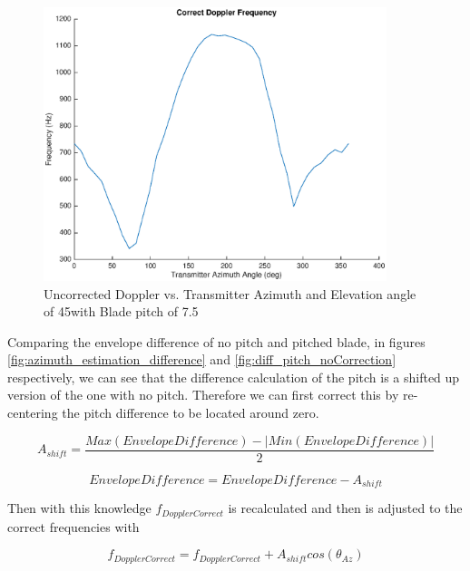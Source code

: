 \begin{figure}
	\begin{center}
		\includegraphics[width=10cm]{images/results/correct_dop_pitch_noCorrection.eps}
		\caption{Uncorrected Doppler vs. Transmitter Azimuth and Elevation angle of 45\textdegree with Blade pitch of 7.5\textdegree}
		\label{fig:dop_pitch_noCorrection}
	\end{center}
\end{figure}

Comparing the envelope difference of no pitch and pitched blade, in figures \ref{fig:azimuth_estimation_difference} and \ref{fig:diff_pitch_noCorrection} respectively, we can see that the difference calculation of the pitch is a shifted up version of the one with no pitch. Therefore we can first correct this by re-centering the pitch difference to be located around zero. 

\begin{equation}
	A_{shift} = \frac{Max(EnvelopeDifference) - |Min(EnvelopeDifference)|}{2}
	\label{eqn:pitch_shift}
\end{equation}

\begin{equation}
	EnvelopeDifference = EnvelopeDifference - A_{shift}
	\label{eqn:diff_shift}
\end{equation}

Then with this knowledge $f_{DopplerCorrect}$ is recalculated and then is adjusted to the correct frequencies with

\begin{equation}
	f_{DopplerCorrect} = f_{DopplerCorrect} + A_{shift}cos\left(\theta_{Az}\right)
	\label{eqn:fd_max}
\end{equation}

